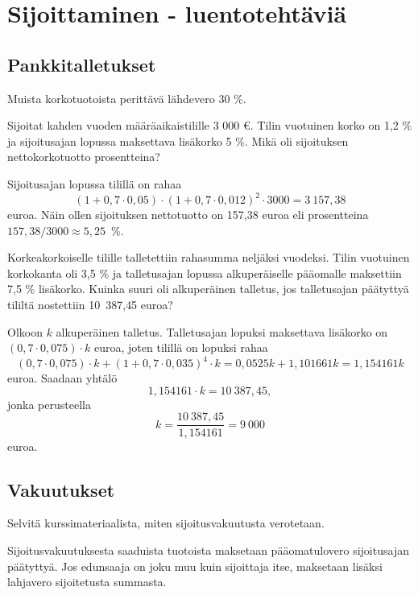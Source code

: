 \documentclass{article}\usepackage[]{graphicx}\usepackage[]{color}
\begin{document}
\section*{Sijoittaminen - luentotehtäviä}

\subsection*{Pankkitalletukset}

Muista korkotuotoista perittävä lähdevero 30 \%.

\begin{question} 
  Sijoitat kahden vuoden määräaikaistilille 3 000 \euro. Tilin vuotuinen korko on 1{,}2 \% ja sijoitusajan lopussa maksettava lisäkorko 5 \%. Mikä oli sijoituksen nettokorkotuotto prosentteina?
\end{question}
\begin{solution}

Sijoitusajan lopussa tilillä on rahaa 
\[
(1+0,7\cdot 0,05)\cdot(1+0,7\cdot 0,012)^2\cdot3000 = 3~157{,}38
\]
euroa. Näin ollen sijoituksen nettotuotto on 157{,}38 euroa eli prosentteina \(157{,}38/3000\approx 5{,}25\)~\%.
\end{solution}

\begin{question} Korkeakorkoiselle tilille talletettiin rahasumma neljäksi vuodeksi. Tilin vuotuinen korkokanta oli 3{,}5 \% ja talletusajan lopussa alkuperäiselle pääomalle maksettiin 7{,}5 \% lisäkorko. Kuinka suuri oli alkuperäinen talletus, jos talletusajan päätyttyä tililtä nostettiin 10~387{,}45 euroa?
\end{question}
\begin{solution}

  Olkoon \(k\) alkuperäinen talletus. Talletusajan lopuksi maksettava lisäkorko on \((0,7\cdot0,075)\cdot k \) euroa, joten tilillä on lopuksi rahaa
  \[
    (0,7\cdot0,075)\cdot k + (1+0,7\cdot0,035)^4\cdot k = 0{,}0525k + 1{,}101661 k = 1{,}154161 k
  \]
euroa. Saadaan yhtälö
 \[
    1{,}154161\cdot k = 10~387{,}45,
  \]
jonka perusteella
\[
  k = \frac{10~387{,}45}{1{,}154161} = 9~000
\]
euroa.
\end{solution}

\subsection*{Vakuutukset}

\begin{question} 
Selvitä kurssimateriaalista, miten sijoitusvakuutusta verotetaan. 
\end{question}
\begin{solution}
Sijoitusvakuutuksesta saaduista tuotoista maksetaan pääomatulovero sijoitusajan päätyttyä. Jos edunsaaja on joku muu kuin sijoittaja itse, maksetaan lisäksi lahjavero sijoitetusta summasta.
\end{solution}
\end{document}
